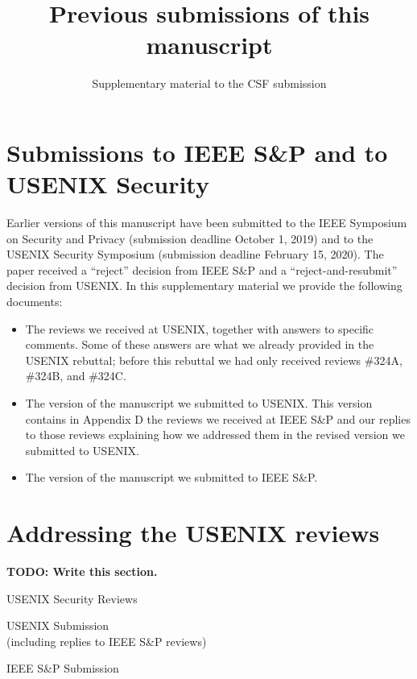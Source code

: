 \documentclass[a4paper]{scrartcl}
\title{Previous submissions of this manuscript}
\subtitle{Supplementary material to the CSF submission}
\date{}
\author{}
\newcommand{\todo}[1]{
  {\color{red} \textbf{ TODO: #1}}
}
\begin{document}
  \maketitle

\section*{Submissions to IEEE S\&P and to USENIX Security}
Earlier versions of this manuscript have been submitted 
to the IEEE Symposium on Security and Privacy (submission deadline October 1, 2019)
and to the USENIX Security Symposium (submission deadline February 15, 2020).
The paper received a ``reject'' decision from IEEE S\&P and a ``reject-and-resubmit''
decision from USENIX. In this supplementary material we provide the following documents:
\begin{itemize}
  \item The reviews we received at USENIX, together with answers to specific comments.
    Some of these answers are what we already provided in the USENIX rebuttal;
    before this rebuttal we had only received reviews \#324A, \#324B, and \#324C.
  \item The version of the manuscript we submitted to USENIX. This version
    contains in Appendix D the reviews we received at IEEE S\&P and our replies
    to those reviews explaining how we addressed them in the revised version
    we submitted to USENIX.
  \item The version of the manuscript we submitted to IEEE S\&P.
\end{itemize}


\section*{Addressing the USENIX reviews}
\todo{Write this section.}

\newpage
\vspace*{7cm}
\begin{center}
  \textsf{
\Huge{USENIX Security Reviews}
}
\end{center}
\newpage









\newpage
\vspace*{7cm}
\begin{center}
  \textsf{
\Huge{USENIX Submission}\\
\large{(including replies to IEEE S\&P reviews)}
}
\end{center}
\newpage



\newpage
\vspace*{7cm}
\begin{center}
  \textsf{
\Huge{IEEE S\&P Submission}\\
}
\end{center}
\newpage


\end{document}

